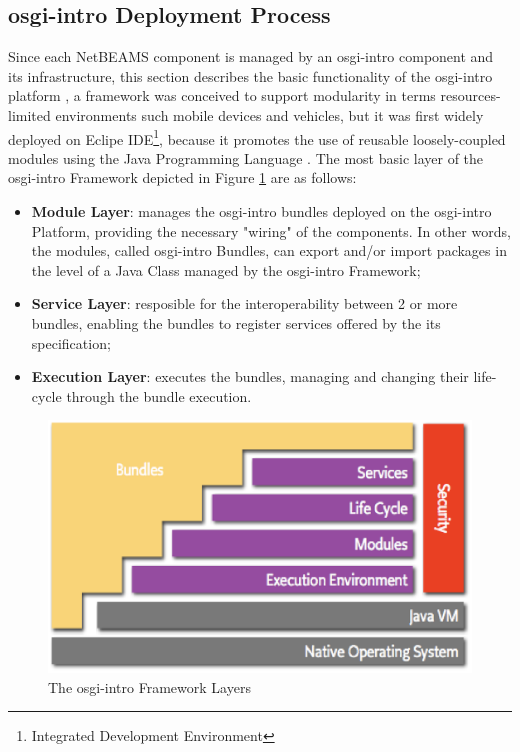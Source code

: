 \subsection{osgi-intro Deployment Process}

Since each NetBEAMS component is managed by an osgi-intro component and its
infrastructure, this section describes the basic functionality of the osgi-intro
platform \cite{osgi-intro}, a framework was conceived to support modularity in
terms resources-limited environments such mobile devices and vehicles, but it
was first widely deployed on Eclipe IDE\footnote{Integrated Development
Environment}, because it promotes the use of reusable loosely-coupled modules
using the Java Programming Language \cite{java}. The most basic layer of the
osgi-intro Framework depicted in Figure \ref{fig:layering-osgi-intro} are as follows:

\begin{itemize}
  \item \textbf{Module Layer}: manages the osgi-intro bundles deployed on the osgi-intro
  Platform, providing the necessary "wiring" of the components. In other words,
  the modules, called osgi-intro Bundles, can export and/or import packages in the
  level of a Java Class managed by the osgi-intro Framework;
  \item \textbf{Service Layer}: resposible for the interoperability between 2
  or more bundles, enabling the bundles to register services offered by
  the its specification;
  \item \textbf{Execution Layer}: executes the bundles, managing and changing
  their life-cycle through the bundle execution.
\end{itemize}

\begin{figure}[!h]
  \centering
  \includegraphics[scale=0.5]{../diagrams/layering-osgi}
  \caption{The osgi-intro Framework Layers}
  \label{fig:layering-osgi-intro}
\end{figure}

